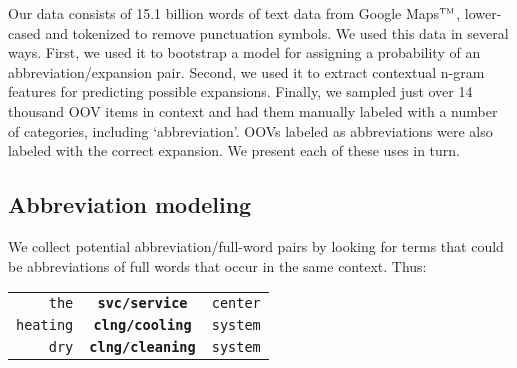 \documentclass[11pt]{article}
\begin{document}
Our data consists of 15.1 billion words of text data from Google Maps$^{\mbox{\tiny TM}}$,
lower-cased and tokenized to remove punctuation symbols. We used this data in
several ways. First, we used it to bootstrap a model for assigning a probability
of an abbreviation/expansion pair.  Second, we used it to extract contextual
n-gram features for predicting possible expansions. Finally, we sampled just
over 14 thousand OOV items in context and had them manually labeled with a number of
categories, including `abbreviation'.  OOVs labeled as abbreviations were also
labeled with the correct expansion.  We present each of these uses in turn.

\vspace{-0.2cm}
\subsection{Abbreviation modeling}\label{sec:pairlm}
We collect potential abbreviation/full-word pairs by looking for terms that
could be abbreviations of full words that occur in the same context. Thus:

{\footnotesize
\begin{center}
\begin{tabular}{rcl}
{\tt the} & {\tt \textbf{svc/service}} & {\tt center}\\
{\tt heating}  & {\tt \textbf{clng/cooling}} & {\tt system}\\
{\tt dry}  & {\tt \textbf{clng/cleaning}} & {\tt system}\\
\end{tabular}
\end{center} } %
\end{document}
